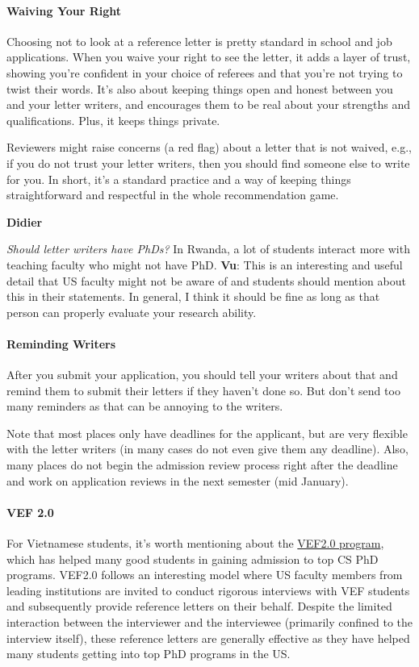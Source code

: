 \documentclass[oneside,11pt]{memoir}
\newenvironment{commentbox}[1][]{
  \small
  \begin{mybox}
    {\small \textbf{#1}}
  }{
  \end{mybox}
}
\begin{document}
\paragraph{Waiving Your Right}  Choosing not to look at a reference letter is pretty standard in school and job applications. When you waive your right to see the letter, it adds a layer of trust, showing you're confident in your choice of referees and that you're not trying to twist their words. It's also about keeping things open and honest between you and your letter writers, and encourages them to be real about your strengths and qualifications. Plus, it keeps things private.

Reviewers might raise concerns (a red flag) about  a letter that is not waived, e.g., if you do not trust your letter writers, then you should find someone else to write for you. In short, it's a standard practice and a way of keeping things straightforward and respectful in the whole recommendation game.

\begin{commentbox}[Didier]
  \emph{Should letter writers have PhDs?}  In Rwanda, a lot of students interact more with teaching faculty who might not have PhD.
  \tcblower
  \textbf{Vu}: This is an interesting and useful detail that US faculty might not be aware of and students should mention about this in their statements. In general, I think it should be fine as long as that person can properly evaluate your research ability.
\end{commentbox}

\paragraph{Reminding Writers} After you submit your application, you should tell your writers about that and remind them to submit their letters if they haven't done so. But don't send too many reminders as that can be annoying to the writers.

Note that most places only have deadlines for the applicant, but are very flexible with the letter writers (in many cases do not even give them any deadline).  Also, many places do not begin the admission review process right after the deadline and work on application reviews in the next semester (mid January).


\paragraph{VEF 2.0} For Vietnamese students, it's worth mentioning about the \href{https://vef2.org/}{VEF2.0 program}, which has helped many good students in gaining admission to top CS PhD programs. VEF2.0 follows an interesting model where US faculty members from leading institutions are invited to conduct rigorous interviews with VEF students and subsequently provide reference letters on their behalf. Despite the limited interaction between the interviewer and the interviewee (primarily confined to the interview itself), these reference letters are generally effective as they have helped many students getting into top PhD programs in the US.
\end{document}

